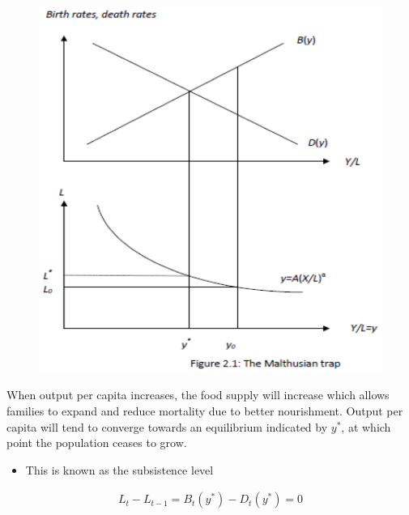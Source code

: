 \documentclass{beamer}
\begin{document}
\begin{frame} 
  \begin{figure}
    \includegraphics[scale=.7]{malthusian_trap.eps}
  \end{figure}
\end{frame}

\begin{frame}
  When output per capita increases, the food supply will increase which allows families to expand and reduce mortality due to better nourishment. 
  Output per capita will tend to converge towards an equilibrium indicated by $y^*$, at which point the population ceases to grow.
  \begin{itemize}
    \item This is known as the subsistence level
  \end{itemize}
  \begin{align}
  L_t-L_{t-1} = B_t(y^*)-D_t(y^*)=0
  \end{align}
\end{frame}
\end{document}
